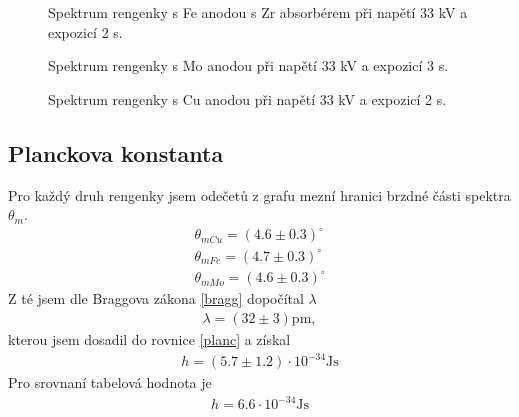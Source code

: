 \documentclass[a4paper,12pt]{article}
\begin{document}
\begin{figure}
\begin{center}

\end{center}
\caption{Spektrum rengenky s Fe anodou s Zr absorbérem při napětí 33 kV a expozicí 2 s.}
\end{figure}

\begin{figure}
\begin{center}

\end{center}
\caption{Spektrum rengenky s Mo anodou při napětí 33 kV a expozicí 3 s.}
\end{figure}

\begin{figure}
\begin{center}

\end{center}
\caption{Spektrum rengenky s Cu anodou při napětí 33 kV a expozicí 2 s.}
\label{posledni}
\end{figure}

\subsection{Planckova konstanta}
Pro každý  druh rengenky jsem odečetů z grafu mezní hranici brzdné části spektra $\theta_m$. 
\begin{eqnarray}
\theta_{mCu}=(4.6 \pm 0.3)^{\circ} \\
\theta_{mFe}=(4.7 \pm 0.3)^{\circ} \\
\theta_{mMo}=(4.6 \pm 0.3)^{\circ}
\end{eqnarray}
Z té jsem dle Braggova zákona \ref{bragg} dopočítal $\lambda$
\begin{eqnarray}
\lambda=(32 \pm 3) \mbox{pm},
\end{eqnarray}
kterou jsem dosadil do rovnice \ref{planc} a získal
\begin{eqnarray}
h=(5.7 \pm 1.2)\cdot 10^{-34} \mbox{Js}
\end{eqnarray}
Pro srovnaní tabelová hodnota je
\begin{eqnarray}
h=6.6\cdot10^{-34} \mbox{Js}
\end{eqnarray}
\end{document}
